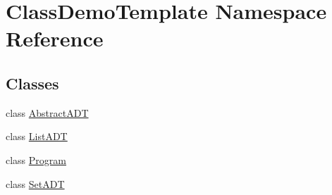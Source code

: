\hypertarget{namespace_class_demo_template}{}\section{Class\+Demo\+Template Namespace Reference}
\label{namespace_class_demo_template}
\subsection*{Classes}
\begin{DoxyCompactItemize}
\item 
class \mbox{\hyperlink{class_class_demo_template_1_1_abstract_a_d_t}{Abstract\+A\+DT}}
\item 
class \mbox{\hyperlink{class_class_demo_template_1_1_list_a_d_t}{List\+A\+DT}}
\item 
class \mbox{\hyperlink{class_class_demo_template_1_1_program}{Program}}
\item 
class \mbox{\hyperlink{class_class_demo_template_1_1_set_a_d_t}{Set\+A\+DT}}
\end{DoxyCompactItemize}
